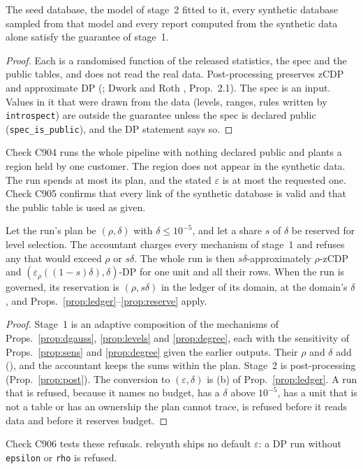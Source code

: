 \setcounter{proposition}{904}
\begin{proposition}\label{prop:post}
The seed database, the model of stage~2 fitted to it, every synthetic database sampled from that model and every report computed from the synthetic data alone satisfy the guarantee of stage~1.
\end{proposition}
\begin{proof}
Each is a randomised function of the released statistics, the spec and the public tables, and does not read the real data. Post-processing preserves zCDP and approximate DP (\cite{bun2016}; Dwork and Roth \cite{dworkroth2014}, Prop.~2.1). The spec is an input. Values in it that were drawn from the data (levels, ranges, rules written by \texttt{introspect}) are outside the guarantee unless the spec is declared public (\texttt{spec\_is\_public}), and the DP statement says so.
\end{proof}
\noindent Check C904 runs the whole pipeline with nothing declared public and plants a region held by one customer. The region does not appear in the synthetic data. The run spends at most its plan, and the stated $\varepsilon$ is at most the requested one. Check C905 confirms that every link of the synthetic database is valid and that the public table is used as given.

\setcounter{proposition}{905}
\begin{proposition}\label{prop:run}
Let the run's plan be $(\rho,\delta)$ with $\delta\le10^{-5}$, and let a share $s$ of $\delta$ be reserved for level selection. The accountant charges every mechanism of stage~1 and refuses any that would exceed $\rho$ or $s\delta$. The whole run is then $s\delta$-approximately $\rho$-zCDP and $(\varepsilon_\rho((1-s)\delta),\delta)$-DP for one unit and all their rows. When the run is governed, its reservation is $(\rho,s\delta)$ in the ledger of its domain, at the domain's $\delta$, and Props.~\ref{prop:ledger}--\ref{prop:reserve} apply.
\end{proposition}
\begin{proof}
Stage~1 is an adaptive composition of the mechanisms of Props.~\ref{prop:dgauss}, \ref{prop:levels} and \ref{prop:degree}, each with the sensitivity of Props.~\ref{prop:sens} and \ref{prop:degree} given the earlier outputs. Their $\rho$ and $\delta$ add (\cite{bun2016}), and the accountant keeps the sums within the plan. Stage~2 is post-processing (Prop.~\ref{prop:post}). The conversion to $(\varepsilon,\delta)$ is (b) of Prop.~\ref{prop:ledger}. A run that is refused, because it names no budget, has a $\delta$ above $10^{-5}$, has a unit that is not a table or has an ownership the plan cannot trace, is refused before it reads data and before it reserves budget.
\end{proof}
\noindent Check C906 tests these refusals. relsynth ships no default $\varepsilon$: a DP run without \texttt{epsilon} or \texttt{rho} is refused.

